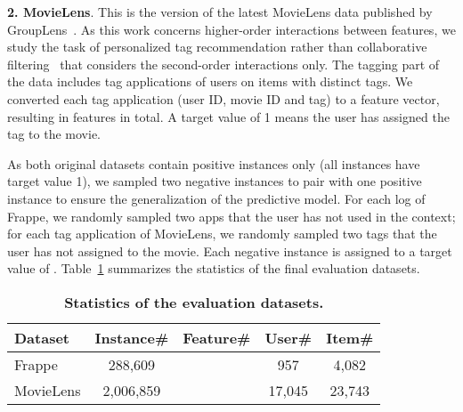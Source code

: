 \textbf{2. MovieLens}. This is the  version of the latest MovieLens data published by GroupLens~\cite{MovielensData}. As this work concerns higher-order interactions between features, we study the task of personalized tag recommendation rather than collaborative filtering~\cite{He:WWW2017} that considers the second-order interactions only. The tagging part of the data includes  tag applications of  users on  items with  distinct tags. We converted each tag application (\ie user ID, movie ID and tag) to a feature vector, resulting in  features in total. A target value of 1 means the user has assigned the tag to the movie. \\\vspace{-5pt}

As both original datasets contain positive instances only (\ie all instances have target value 1), we sampled two negative instances to pair with one positive instance to ensure the generalization of the predictive model. 
For each log of Frappe, we randomly sampled two apps that the user has not used in the context; for each tag application of MovieLens, we randomly sampled two tags that the user has not assigned to the movie. 
Each negative instance is assigned to a target value of . Table~\ref{tab:dataset} summarizes the statistics of the final evaluation datasets. 

\begin{table}[t]
	\begin{center}
		\caption{\textbf{Statistics of the evaluation datasets.}}
		\vspace{-10pt}
		\label{tab:dataset}
		\begin{tabular}{ | l | c | c | c | c | }
			\hline
			\textbf{Dataset} & \textbf{Instance\#} & \textbf{Feature\#} & \textbf{User\#} & \textbf{Item\#} \\ \hline
			Frappe	& 288,609 &  & 957 & 4,082\\ \hline
			MovieLens	& 2,006,859	&  & 17,045 & 23,743 \\ \hline
		\end{tabular}
		\vspace{-15pt}
	\end{center}
\end{table}

